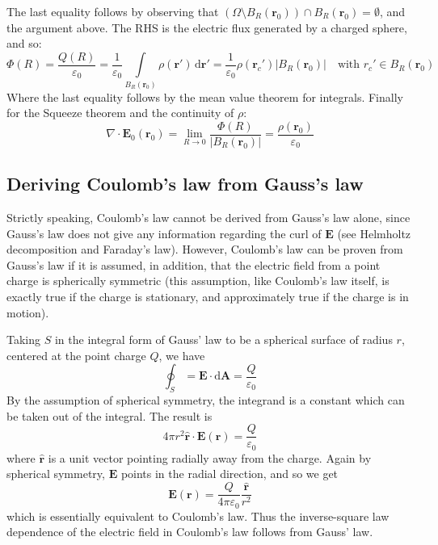 \documentclass[a4paper, 12pt]{article}
\begin{document}
The last equality follows by observing that \((\Omega \setminus B_R(\mathbf{r}_0)) \cap B_R(\mathbf{r}_0) = \emptyset\), and the argument above.
The RHS is the electric flux generated by a charged sphere, and so:
\[
    \Phi(R) = \frac{Q(R)}{\varepsilon_0}
    = \frac{1}{\varepsilon_0}
        \int\limits_{B_R(\mathbf{r}_0)}
            \rho(\mathbf{r}') \, \mathrm{d}\mathbf{r}'
    = \frac{1}{\varepsilon_0}
        \rho(\mathbf{r}_c') |B_R(\mathbf{r}_0)|
            \quad \text{with } r_c' \in B_R(\mathbf{r}_0)
\]
Where the last equality follows by the mean value theorem for integrals. Finally for the Squeeze theorem and the continuity of \(\rho\): 
\[
    \nabla \cdot \mathbf{E}_0(\mathbf{r}_0) =
        \lim_{R \to 0} \frac{\Phi(R)}{|B_R(\mathbf{r}_0)|}
    = \frac{\rho(\mathbf{r}_0)}{\varepsilon_0}
\]

\subsection{Deriving Coulomb's law from Gauss's law}
Strictly speaking, Coulomb's law cannot be derived from Gauss's law alone, since Gauss's law does not give any information regarding the curl of \(\mathbf{E}\) (see Helmholtz decomposition and Faraday's law). However, Coulomb's law can be proven from Gauss's law if it is assumed, in addition, that the electric field from a point charge is spherically symmetric (this assumption, like Coulomb's law itself, is exactly true if the charge is stationary, and approximately true if the charge is in motion). 

\begin{mdframed}[%
    style=mystyle,%
    frametitle={Outline of proof}]

Taking \(S\) in the integral form of Gauss' law to be a spherical surface of radius \(r\), centered at the point charge \(Q\), we have 
\[
    \oint_S = \mathbf{E} \cdot \mathrm{d}\mathbf{A} = \frac{Q}{\varepsilon_0}
\]
By the assumption of spherical symmetry, the integrand is a constant which can be taken out of the integral. The result is 
\[
    4 \pi r^2 \hat{\mathbf{r}} \cdot \mathbf{E}(\mathbf{r}) = \frac{Q}{\varepsilon_0}
\]
where \(\hat{\mathbf{r}}\) is a unit vector pointing radially away from the charge. Again by spherical symmetry, \(\mathbf{E}\) points in the radial direction, and so we get 
\[
    \mathbf{E}(\mathbf{r}) = \frac{Q}{4 \pi \varepsilon_0} \frac{\hat{\mathbf{r}}}{r^2}
\]
which is essentially equivalent to Coulomb's law. Thus the inverse-square law dependence of the electric field in Coulomb's law follows from Gauss' law. 
\end{mdframed}
\end{document}
